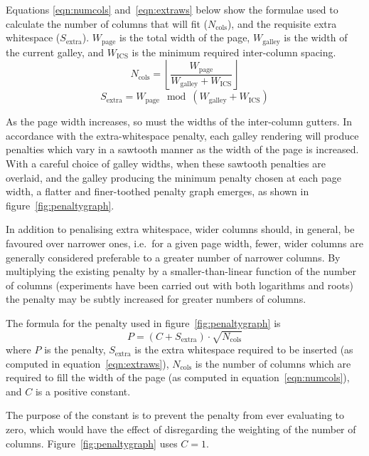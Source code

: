 Equations \ref{eqn:numcols} and~\ref{eqn:extraws} below show the formulae used to calculate the number of columns that will fit ($N_\text{cols}$), and the requisite extra whitespace ($S_\text{extra}$). $W_\text{page}$ is the total width of the page, $W_\text{galley}$ is the width of the current galley, and $W_\text{ICS}$ is the minimum required inter-column spacing.
\begin{equation}\label{eqn:numcols}
N_\text{cols}=\left\lfloor\frac{W_\text{page}}{W_\text{galley}+W_\text{ICS}}\right\rfloor
\end{equation}
\begin{equation}\label{eqn:extraws}
S_\text{extra}=W_\text{page}\!\!\mod \left(W_\text{galley}+W_\text{ICS}\right)
\end{equation}

As the page width increases, so must the widths of the inter-column gutters. In accordance with the extra-whitespace penalty, each galley rendering will produce penalties which vary in a sawtooth manner as the width of the page is increased. With a careful choice of galley widths, when these sawtooth penalties are overlaid, and the galley producing the minimum penalty chosen at each page width, a flatter and finer-toothed penalty graph emerges, as shown in figure~\ref{fig:penaltygraph}.

In addition to penalising extra whitespace, wider columns should, in general, be favoured over narrower ones, i.e.~for a given page width, fewer, wider columns are generally considered preferable to a greater number of narrower columns. By multiplying the existing penalty by a smaller-than-linear function of the number of columns (experiments have been carried out with both logarithms and roots) the penalty may be subtly increased for greater numbers of columns.

The formula for the penalty used in figure~\ref{fig:penaltygraph} is \begin{equation}P = (C + S_\text{extra})\cdot\sqrt{N_\text{cols}}\end{equation} where $P$ is the penalty, $S_\text{extra}$ is the extra whitespace required to be inserted (as computed in equation~\ref{eqn:extraws}), $N_\text{cols}$ is the number of columns which are required to fill the width of the page (as computed in equation~\ref{eqn:numcols}), and $C$ is a positive constant.

The purpose of the constant is to prevent the penalty from ever evaluating to zero, which would have the effect of disregarding the weighting of the number of columns. Figure~\ref{fig:penaltygraph} uses $C=1$.

